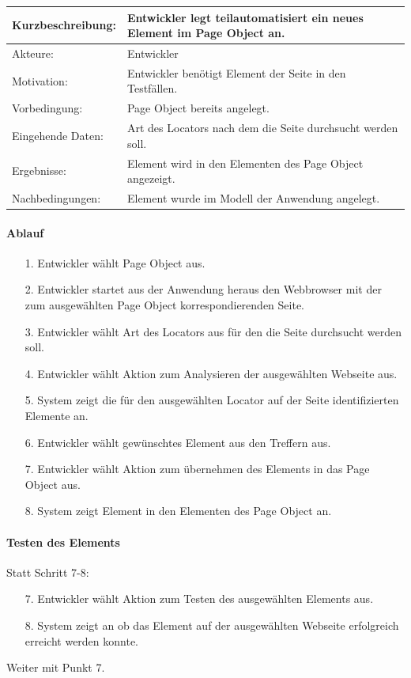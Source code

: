 \begin{tabular}[h]{|p{4cm}|p{}|}
\hline 
\rule[-1ex]{0pt}{2.5ex}Kurzbeschreibung: & 
Entwickler legt teilautomatisiert ein neues Element im Page Object an. \\  
\hline 
\rule[-1ex]{0pt}{2.5ex}Akteure: & 
Entwickler \\ 
\hline 
\rule[-1ex]{0pt}{2.5ex}Motivation: & 
Entwickler benötigt Element der Seite in den Testfällen. \\ 
\hline 
\rule[-1ex]{0pt}{2.5ex}Vorbedingung: & 
Page Object bereits angelegt. \\ 
\hline 
\rule[-1ex]{0pt}{2.5ex}Eingehende Daten: & Art des Locators nach dem die Seite durchsucht werden soll. \\ 
\hline 
\rule[-1ex]{0pt}{2.5ex}Ergebnisse: & Element wird in den Elementen des Page Object angezeigt. \\ 
\hline 
\rule[-1ex]{0pt}{2.5ex}Nachbedingungen: & Element wurde im Modell der Anwendung angelegt.  \\ 
\hline 
\end{tabular} 

\paragraph{Ablauf}

\begin{itemize}[itemsep=0pt]
\item[1.] Entwickler wählt Page Object aus.
\item[2.] Entwickler startet aus der Anwendung heraus den Webbrowser mit der zum ausgewählten Page Object korrespondierenden Seite. 
\item[3.] Entwickler wählt Art des Locators aus für den die Seite durchsucht werden soll.
\item[4.] Entwickler wählt Aktion zum Analysieren der ausgewählten Webseite aus.
\item[5.] System zeigt die für den ausgewählten Locator auf der Seite identifizierten Elemente an.
\item[6.] Entwickler wählt gewünschtes Element aus den Treffern aus. 
\item[7.] Entwickler wählt Aktion zum übernehmen des Elements in das Page Object aus.
\item[8.] System zeigt Element in den Elementen des Page Object an.
\end{itemize}

\paragraph{Testen des Elements}
Statt Schritt 7-8:
\begin{itemize}
\item[7.] Entwickler wählt Aktion zum Testen des ausgewählten Elements aus. 
\item[8.] System zeigt an ob das Element auf der ausgewählten Webseite erfolgreich erreicht werden konnte. 
\end{itemize}
Weiter mit Punkt 7. 


